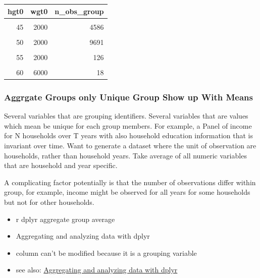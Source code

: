 \documentclass[
]{book}
\providecommand{\tightlist}{%
  \setlength{\itemsep}{0pt}\setlength{\parskip}{0pt}}
\begin{document}
\begin{table}[!h]
\centering
\begin{tabular}{r|r|r}
\hline
hgt0 & wgt0 & n\_obs\_group\\
\hline
\cellcolor{gray!6}{40} & \cellcolor{gray!6}{2000} & \cellcolor{gray!6}{122}\\
\hline
45 & 2000 & 4586\\
\hline
\cellcolor{gray!6}{45} & \cellcolor{gray!6}{4000} & \cellcolor{gray!6}{470}\\
\hline
50 & 2000 & 9691\\
\hline
\cellcolor{gray!6}{50} & \cellcolor{gray!6}{4000} & \cellcolor{gray!6}{13106}\\
\hline
55 & 2000 & 126\\
\hline
\cellcolor{gray!6}{55} & \cellcolor{gray!6}{4000} & \cellcolor{gray!6}{1900}\\
\hline
60 & 6000 & 18\\
\hline
\end{tabular}
\end{table}

\hypertarget{aggrgate-groups-only-unique-group-show-up-with-means}{%
\subsubsection{Aggrgate Groups only Unique Group Show up With Means}\label{aggrgate-groups-only-unique-group-show-up-with-means}}

Several variables that are grouping identifiers. Several variables that are values which mean be unique for each group members. For example, a Panel of income for N households over T years with also household education information that is invariant over time. Want to generate a dataset where the unit of observation are households, rather than household years. Take average of all numeric variables that are household and year specific.

A complicating factor potentially is that the number of observations differ within group, for example, income might be observed for all years for some households but not for other households.

\begin{itemize}
\tightlist
\item
  r dplyr aggregate group average
\item
  Aggregating and analyzing data with dplyr
\item
  column can't be modified because it is a grouping variable
\item
  see also: \href{https://datacarpentry.org/dc_zurich/R-ecology/04-dplyr.html}{Aggregating and analyzing data with dplyr}
\end{itemize}
\end{document}
